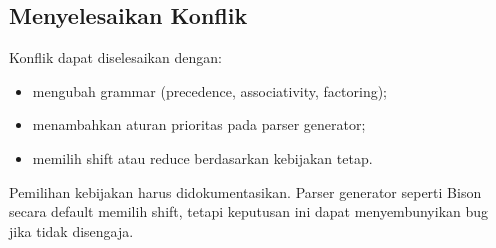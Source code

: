 \subsection{Menyelesaikan Konflik}

Konflik dapat diselesaikan dengan:
\begin{itemize}[leftmargin=*]
  \item mengubah grammar (precedence, associativity, factoring);
  \item menambahkan aturan prioritas pada parser generator;
  \item memilih shift atau reduce berdasarkan kebijakan tetap.
\end{itemize}

Pemilihan kebijakan harus didokumentasikan. Parser generator seperti
Bison secara default memilih shift, tetapi keputusan ini dapat
menyembunyikan bug jika tidak disengaja.
